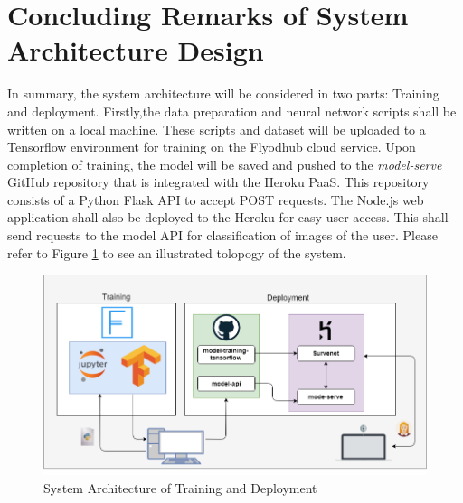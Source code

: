 \section{Concluding Remarks of System Architecture Design}
In summary, the system architecture will be considered in two parts: Training and deployment. Firstly,the data preparation and neural network scripts shall be written on a local machine. These scripts and dataset will be uploaded to a Tensorflow environment for training on the Flyodhub cloud service. Upon completion of training, the model will be saved and pushed to the \textit{model-serve} GitHub repository that is integrated with the Heroku PaaS. This repository consists of a Python Flask API to accept POST requests. The Node.js web application shall also be deployed to the Heroku for easy user access. This shall send requests to the model API for classification of images of the user.
Please refer to Figure \ref{arch} to see an illustrated tolopogy of the system.

\begin{figure}[ht]
	\begin{center}
		\advance\leftskip-3cm
		\advance\rightskip-3cm
		\includegraphics[keepaspectratio=true,scale=0.55]{__resources/arch.png}
		\caption{System Architecture of Training and Deployment}
		\label{arch}
	\end{center}
\end{figure}

